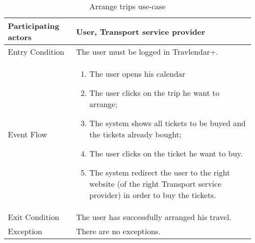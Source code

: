 \begin{table}[H]
	\begin{center}
		\begin{tabular}{ | p{} | p{} | }
		\hline
		Participating actors &  User, Transport service provider\\
		\hline
		Entry Condition & The user must be logged in Travlendar+.\\
		\hline
		Event Flow & 
			\begin{enumerate}
				\item The user opens his calendar
				\item The user clicks on the trip he want to arrange;
				\item The system shows all tickets to be buyed and the tickets already bought;
				\item The user clicks on the ticket he want to buy.
				\item The system redirect the user to the right website (of the right Transport service provider) in order to buy the tickets.
			\end{enumerate} \\
		\hline
		Exit Condition & The user has successfully arranged his travel. \\
		\hline
		Exception & There are no exceptions. \\ 
		\hline
		\end{tabular}
	\end{center}
	\caption{Arrange trips use-case}
\end{table}